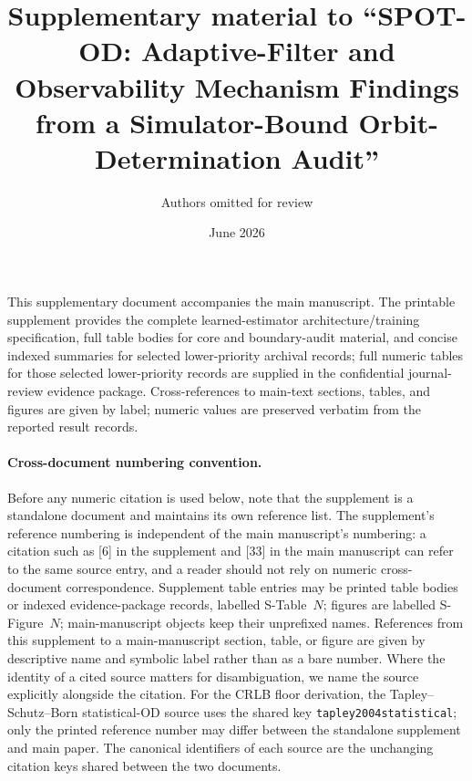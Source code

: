 \documentclass{article}
\title{Supplementary material to ``SPOT-OD: Adaptive-Filter and Observability Mechanism Findings from a Simulator-Bound Orbit-Determination Audit''}
\author{Authors omitted for review}
\date{June 2026}
\begin{document}
\maketitle
\renewcommand{\tablename}{S-Table}
\renewcommand{\figurename}{S-Figure}

\noindent This supplementary document accompanies the main manuscript. The printable supplement provides the complete learned-estimator architecture/training specification, full table bodies for core and boundary-audit material, and concise indexed summaries for selected lower-priority archival records; full numeric tables for those selected lower-priority records are supplied in the confidential journal-review evidence package. Cross-references to main-text sections, tables, and figures are given by label; numeric values are preserved verbatim from the reported result records.

\paragraph{Cross-document numbering convention.}
Before any numeric citation is used below, note that the supplement is a standalone document and maintains its own reference list. The supplement's reference numbering is independent of the main manuscript's numbering: a citation such as [6] in the supplement and [33] in the main manuscript can refer to the same source entry, and a reader should not rely on numeric cross-document correspondence. Supplement table entries may be printed table bodies or indexed evidence-package records, labelled S-Table~$N$; figures are labelled S-Figure~$N$; main-manuscript objects keep their unprefixed names. References from this supplement to a main-manuscript section, table, or figure are given by descriptive name and symbolic label rather than as a bare number. Where the identity of a cited source matters for disambiguation, we name the source explicitly alongside the citation. For the CRLB floor derivation, the Tapley--Schutz--Born statistical-OD source uses the shared key \texttt{tapley2004statistical}; only the printed reference number may differ between the standalone supplement and main paper. The canonical identifiers of each source are the unchanging citation keys shared between the two documents.
\end{document}
